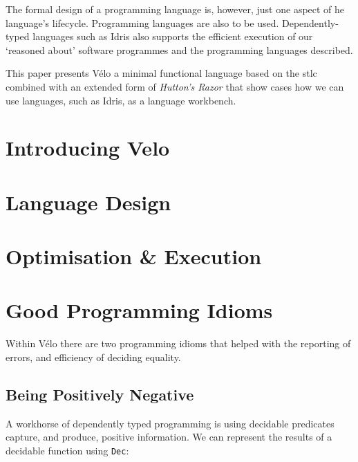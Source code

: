\documentclass[%
draft,
a4paper,
UKenglish,
cleveref,
autoref,
thm-restate,
pdfa
]{oasics-v2021}
\newcommand{\Velo}{V{\'e}lo\xspace}
\begin{document}
The formal design of a programming language is, however, just one aspect of he language's lifecycle.
Programming languages are also to be used.
Dependently-typed languages such as Idris also supports the efficient execution of our `reasoned about' software programmes and the programming languages described.

This paper presents \Velo{} a minimal functional language based on the \ac{stlc} combined with an extended form of \emph{Hutton's Razor} that show cases how we can use languages, such as Idris, as a language workbench.

\section{Introducing Velo}
\label{sec:velo}



\section{Language Design}
\label{sec:design}


\section{Optimisation \& Execution}
\label{sec:compiler}



\section{Good Programming Idioms}
\label{sec:idioms}

Within \Velo{} there are two programming idioms that helped with the reporting of errors, and efficiency of deciding equality.

\subsection{Being Positively Negative}
\label{sec:idioms:posneg}

A workhorse of dependently typed programming is using decidable predicates capture, and produce, positive information.
We can represent the results of a decidable function using \texttt{Dec}:
\end{document}
